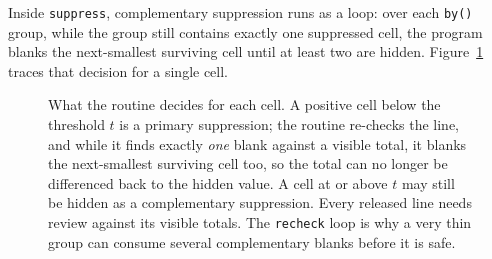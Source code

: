 Inside \texttt{suppress}, complementary suppression runs as a loop: over each \texttt{by()} group, while the group still contains exactly one suppressed cell, the program blanks the next-smallest surviving cell until at least two are hidden. Figure~\ref{fig:ch14-viz-suppress} traces that decision for a single cell.

\begin{figure}[htbp]
\centering
{}
\caption[The suppression decision, cell by cell]{What the routine decides for each cell. A positive cell below the threshold $t$ is a primary suppression; the routine re-checks the line, and while it finds exactly \emph{one} blank against a visible total, it blanks the next-smallest surviving cell too, so the total can no longer be differenced back to the hidden value. A cell at or above $t$ may still be hidden as a complementary suppression. Every released line needs review against its visible totals. The \texttt{recheck} loop is why a very thin group can consume several complementary blanks before it is safe.}
\label{fig:ch14-viz-suppress}
\end{figure}

